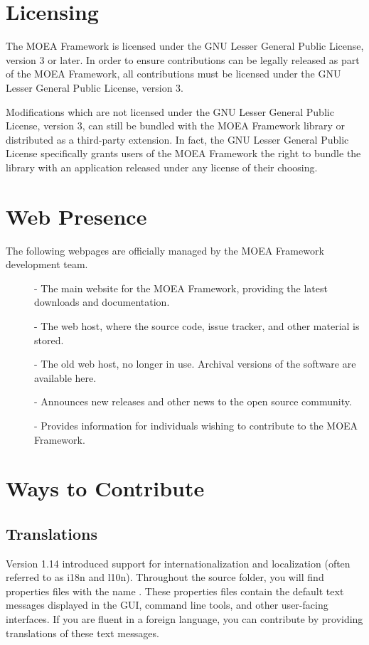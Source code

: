 \section{Licensing}
The MOEA Framework is licensed under the GNU Lesser General Public License, version 3 or later.  In order to ensure contributions can be legally released as part of the MOEA Framework, all contributions must be licensed under the GNU Lesser General Public License, version 3.

Modifications which are not licensed under the GNU Lesser General Public License, version 3, can still be bundled with the MOEA Framework library or distributed as a third-party extension.  In fact, the GNU Lesser General Public License specifically grants users of the MOEA Framework the right to bundle the library with an application released under any license of their choosing.

\section{Web Presence}
The following webpages are officially managed by the MOEA Framework development team.

\begin{description}
  \item[] - The main website for the MOEA Framework, providing the latest downloads and documentation.
  \item[] - The web host, where the source code, issue tracker, and other material is stored.
  \item[] - The old web host, no longer in use.  Archival versions of the software are available here.
  \item[] - Announces new releases and other news to the open source community.
  \item[] - Provides information for individuals wishing to contribute to the MOEA Framework.
\end{description}

\section{Ways to Contribute}

\subsection{Translations}
Version 1.14 introduced support for internationalization and localization (often referred to as i18n and l10n).  Throughout the source folder, you will find properties files with the name .  These properties files contain the default text messages displayed in the GUI, command line tools, and other user-facing interfaces.  If you are fluent in a foreign language, you can contribute by providing translations of these text messages.

